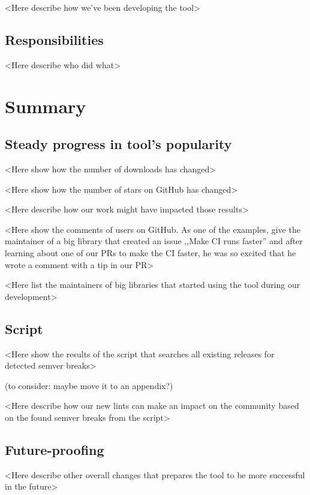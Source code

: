 \documentclass[licencjacka,en]{pracamgr}
\begin{document}
<Here describe how we've been developing the tool>


\section{Responsibilities}

<Here describe who did what>



\chapter{Summary}\label{r:summary}

\section{Steady progress in tool's popularity}

<Here show how the number of downloads has changed>

<Here show how the number of stars on GitHub has changed>

<Here describe how our work might have impacted those results>

<Here show the comments of users on GitHub.
As one of the examples, give the maintainer of a big
library that created an issue ,,Make CI runs faster''
and after learning about one of our PRs to make the CI faster,
he was so excited that he wrote a comment with a tip in our PR>

<Here list the maintainers of big libraries that started using the tool during our development>


\section{Script}

<Here show the results of the script that searches all existing releases for detected semver breaks>

(to consider: maybe move it to an appendix?)

<Here describe how our new lints can make an impact on the community based on the found semver breaks from the script>


\section{Future-proofing}

<Here describe other overall changes that prepares the tool to be more successful in the future>
\end{document}
